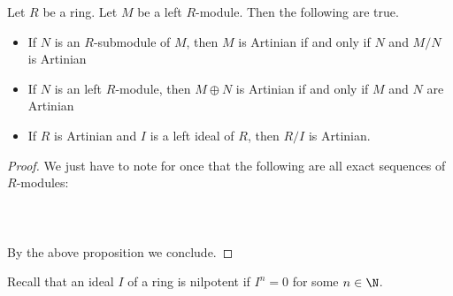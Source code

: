 \documentclass[a4paper]{article}
\begin{document}
\begin{crl}{}{} Let $R$ be a ring. Let $M$ be a left $R$-module. Then the following are true. 
\begin{itemize}
\item If $N$ is an $R$-submodule of $M$, then $M$ is Artinian if and only if $N$ and $M/N$ is Artinian
\item If $N$ is an left $R$-module, then $M\oplus N$ is Artinian if and only if $M$ and $N$ are Artinian
\item If $R$ is Artinian and $I$ is a left ideal of $R$, then $R/I$ is Artinian. 
\end{itemize} \tcbline
\begin{proof}
We just have to note for once that the following are all exact sequences of $R$-modules: \\~\\
\\~\\
By the above proposition we conclude. 
\end{proof}
\end{crl}

Recall that an ideal $I$ of a ring is nilpotent if $I^n=0$ for some $n\in\N$. 
\end{document}
